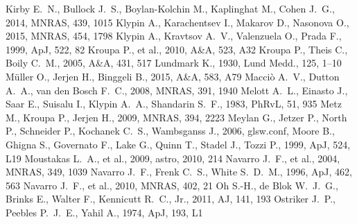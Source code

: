 \documentclass[a4wide,12pt]{book}
\begin{document}
\begin{thebibliography}{}
Kirby E.~N., Bullock J.~S., Boylan-Kolchin M., Kaplinghat M., Cohen J.~G., 
2014, MNRAS, 439, 1015  
Klypin A., Karachentsev I., Makarov D., Nasonova O., 2015, MNRAS, 454, 1798 
Klypin A., Kravtsov A.~V., Valenzuela O., Prada F., 1999, ApJ, 522, 82 
 Kroupa P., et al., 2010, A\&A, 523, A32 
 Kroupa P., Theis C., Boily C.~M., 2005, A\&A, 431, 517 
Lundmark K., 1930, Lund Medd., 125, 1–10
 M{\"u}ller O., Jerjen H., Binggeli B., 2015, A\&A, 583, A79 
 Macci{\`o} A.~V., Dutton A.~A., van den Bosch F.~C., 2008, MNRAS, 391, 1940 
Melott A.~L., Einasto J., Saar E., Suisalu I., Klypin A.~A., Shandarin 
S.~F., 1983, PhRvL, 51, 935 
 Metz M., Kroupa P., Jerjen H., 2009, MNRAS, 394, 2223
Meylan G., Jetzer P., North P., Schneider P., Kochanek C.~S., Wambsganss 
J., 2006, glsw.conf,  
Moore B., Ghigna S., Governato F., Lake G., Quinn T., Stadel J., Tozzi P., 
1999, ApJ, 524, L19 
 Moustakas L.~A., et al., 2009, astro, 
2010, 214 
 Navarro J.~F., et al., 2004, MNRAS, 349, 
1039
 Navarro J.~F., Frenk C.~S., White S.~D.~M., 1996, ApJ, 462, 563 
 Navarro J.~F., et al., 2010, MNRAS, 402, 
21
 Oh 
S.-H., de Blok W.~J.~G., Brinks E., Walter F., Kennicutt R.~C., Jr., 2011, 
AJ, 141, 193 
 Ostriker J.~P., Peebles P.~J.~E., Yahil A., 1974, ApJ, 193, L1 

\end{thebibliography}
\end{document}
